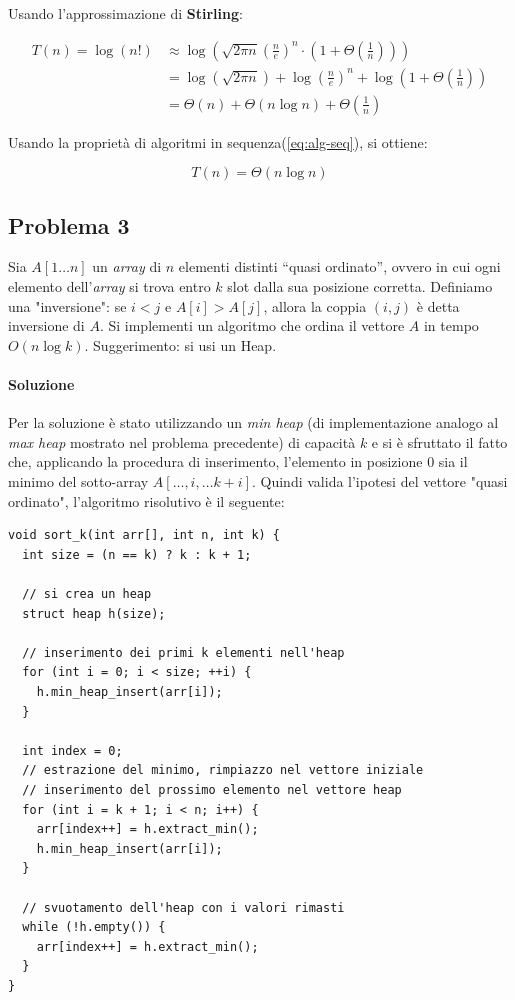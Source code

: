 \documentclass{article}
\begin{document}
Usando l'approssimazione di \textbf{Stirling}:

\begin{align*}
    T(n) = \log (n!) &\approx \log \left(\sqrt{2\pi n} \left(\frac{n}{e}\right)^n \cdot \left(1 + \Theta\left(\frac{1}{n}\right)\right)\right) \\
    &= \log (\sqrt{2 \pi n}) + \log\left(\frac{n}{e}\right)^n + \log \left(1 + \Theta\left(\frac{1}{n}\right)\right)\\ 
    &= \Theta(n) + \Theta(n \log n) + \Theta\left(\frac{1}{n}\right)
\end{align*}

Usando la proprietà di algoritmi in sequenza(\cref{eq:alg-seq}), si ottiene:

\begin{equation*}
    T(n) = \Theta(n \log n)
\end{equation*}

\clearpage

\subsection{Problema 3}
Sia $A[1\dots n]$ un \textit{array} di $n$ elementi distinti “quasi ordinato”, ovvero in cui ogni elemento dell’\textit{array} si trova entro $k$ slot dalla sua posizione corretta. Definiamo una "inversione": se $i<j$ e $A[i] > A[j]$, allora la coppia $(i,j)$ è detta inversione di $A$. Si implementi un algoritmo che ordina il vettore $A$ in tempo $O(n \log k)$. Suggerimento: si usi un Heap.

\paragraph{Soluzione} Per la soluzione è stato utilizzando un \textit{min heap} (di implementazione analogo al \textit{max heap} mostrato nel problema precedente)  di capacità $k$ e si è sfruttato il fatto che, applicando la procedura di inserimento, l'elemento in posizione $0$ sia il minimo del sotto-array $A[\dots,i, \dots k+i]$. Quindi valida l'ipotesi del vettore "quasi ordinato", l'algoritmo risolutivo è il seguente:


\begin{lstlisting}[caption={Algoritmo per ordinare un vettore "quasi ordinato" mediante heap},captionpos=b]
void sort_k(int arr[], int n, int k) {
  int size = (n == k) ? k : k + 1;

  // si crea un heap
  struct heap h(size);

  // inserimento dei primi k elementi nell'heap
  for (int i = 0; i < size; ++i) {
    h.min_heap_insert(arr[i]);
  }

  int index = 0;
  // estrazione del minimo, rimpiazzo nel vettore iniziale
  // inserimento del prossimo elemento nel vettore heap
  for (int i = k + 1; i < n; i++) {
    arr[index++] = h.extract_min();
    h.min_heap_insert(arr[i]);
  }

  // svuotamento dell'heap con i valori rimasti
  while (!h.empty()) {
    arr[index++] = h.extract_min();
  }
}
\end{lstlisting}
\end{document}
